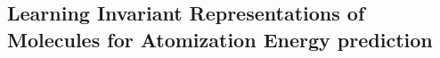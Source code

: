 \documentclass[10pt,journal,a4paper]{IEEEtran}
\begin{document}


%
%


%


\subsection{Learning Invariant Representations of Molecules for Atomization Energy prediction}
\end{document}
